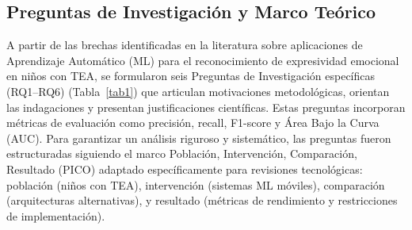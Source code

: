 \documentclass[3p,twocolumn,times]{elsarticle}
\begin{document}
	\subsection{Preguntas de Investigación y Marco Teórico}\label{sec2a}
	
	A partir de las brechas identificadas en la literatura sobre aplicaciones de
	Aprendizaje Automático (ML) para el reconocimiento de expresividad emocional en
	niños con TEA, se formularon seis Preguntas de Investigación específicas
	(RQ1--RQ6) (Tabla~\ref{tab1}) que articulan motivaciones metodológicas, orientan
	las indagaciones y presentan justificaciones científicas. Estas preguntas
	incorporan métricas de evaluación como precisión, recall, F1-score y Área Bajo la
	Curva (AUC). Para garantizar un análisis riguroso y sistemático, las preguntas
	fueron estructuradas siguiendo el marco Población, Intervención, Comparación,
	Resultado (PICO) adaptado específicamente para revisiones tecnológicas: población
	(niños con TEA), intervención (sistemas ML móviles), comparación (arquitecturas
	alternativas), y resultado (métricas de rendimiento y restricciones de
	implementación).
	
\end{document}

